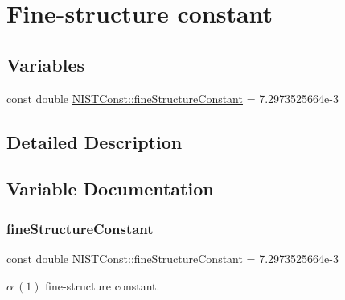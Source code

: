 \hypertarget{group___fine_structure_constant}{}\section{Fine-\/structure constant}
\label{group___fine_structure_constant}
\subsection*{Variables}
\begin{DoxyCompactItemize}
\item 
const double \hyperlink{group___fine_structure_constant_ga0f1ddaca2627b7253ed177aa1b074724}{N\+I\+S\+T\+Const\+::fine\+Structure\+Constant} = 7.\+2973525664e-\/3
\end{DoxyCompactItemize}


\subsection{Detailed Description}


\subsection{Variable Documentation}
\mbox{\label{group___fine_structure_constant_ga0f1ddaca2627b7253ed177aa1b074724}} 
\subsubsection{\texorpdfstring{fine\+Structure\+Constant}{fineStructureConstant}}
{\footnotesize\ttfamily const double N\+I\+S\+T\+Const\+::fine\+Structure\+Constant = 7.\+2973525664e-\/3}

$\alpha \ (1)$ fine-\/structure constant. 